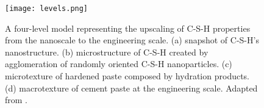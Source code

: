 \begin{figure}[H]
    \centering
    \texttt{[image: levels.png]}
    \caption{A four-level model representing the upscaling of C-S-H properties from the nanoscale to the engineering scale. (a) snapshot of C-S-H's nanostructure. (b) microstructure of C-S-H created by agglomeration of randomly oriented C-S-H nanoparticles. (c) microtexture of hardened paste composed by hydration products. (d) macrotexture of cement paste at the engineering scale. Adapted from \supercite{AbdolhosseiniQomi2015}.}
    \label{fig:figure1}
\end{figure}


